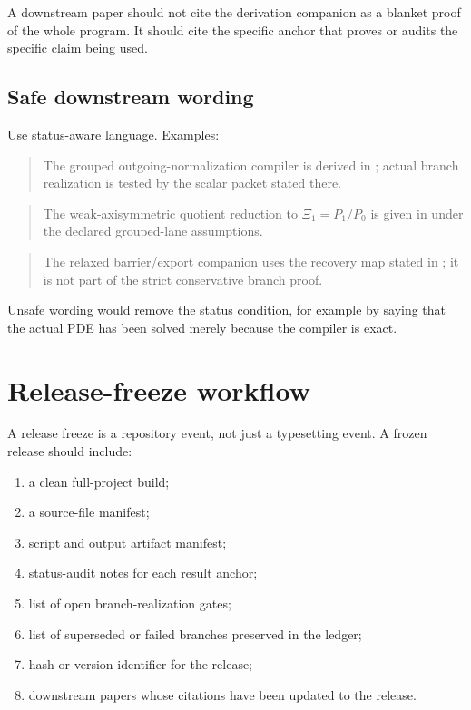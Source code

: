 A downstream paper should not cite the derivation companion as a blanket proof of the whole program.  It should cite the specific anchor that proves or audits the specific claim being used.

\subsection{Safe downstream wording}
\label{subsec:fill-safe-downstream-wording}

Use status-aware language.  Examples:

\begin{quote}
The grouped outgoing-normalization compiler is derived in ; actual branch realization is tested by the scalar packet stated there.
\end{quote}

\begin{quote}
The weak-axisymmetric quotient reduction to \(\Xi_1=P_1/P_0\) is given in  under the declared grouped-lane assumptions.
\end{quote}

\begin{quote}
The relaxed barrier/export companion uses the recovery map stated in ; it is not part of the strict conservative branch proof.
\end{quote}

Unsafe wording would remove the status condition, for example by saying that the actual PDE has been solved merely because the compiler is exact.

\section{Release-freeze workflow}
\label{sec:fill-release-freeze-workflow}

A release freeze is a repository event, not just a typesetting event.  A frozen release should include:

\begin{enumerate}[leftmargin=2.4em]
\item a clean full-project build;
\item a source-file manifest;
\item script and output artifact manifest;
\item status-audit notes for each result anchor;
\item list of open branch-realization gates;
\item list of superseded or failed branches preserved in the ledger;
\item hash or version identifier for the release;
\item downstream papers whose citations have been updated to the release.
\end{enumerate}

